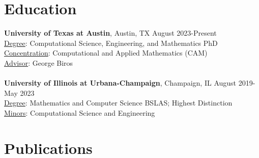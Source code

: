 \documentclass[resmargin, 10pt]{res} %
\begin{document}
\begin{resume}


\vspace{-20pt}

\section{Education}

{\bf University of Texas at Austin}, Austin, TX \hfill August 2023-Present \\
\underline{Degree}: Computational Science, Engineering, and Mathematics PhD \\ %
\underline{Concentration}: Computational and Applied Mathematics (CAM)\\
\underline{Advisor}: George Biros \\ \\
{\bf University of Illinois at Urbana-Champaign}, Champaign, IL \hfill August 2019-May 2023 \\
\underline{Degree}: Mathematics and Computer Science BSLAS; Highest Distinction \\ %
\underline{Minors}: Computational Science and Engineering \\

\vspace{-8pt}
\section{Publications}
\begin{refsection}
    \nocite{*} %
    \printbibliography[heading=none,type=article]
\end{refsection}
\vspace{15pt}

\vspace{-8pt}

\end{resume}
\end{document}
